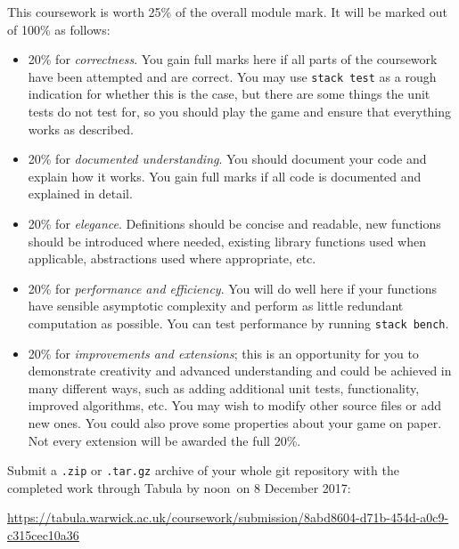 \documentclass{cs256-shared/cs256}
\newcommand{\deadlineTime}{noon}
\newcommand{\deadlineDate}{8 December 2017}
\newcommand{\submissionURL}{https://tabula.warwick.ac.uk/coursework/submission/8abd8604-d71b-454d-a0c9-c315cec10a36}
\begin{document}
This coursework is worth 25\% of the overall module mark. It will be marked out of 100\% as follows:
\begin{itemize}
    \item 20\% for \emph{correctness}. You gain full marks here if all parts of the coursework have been attempted and are correct. You may use \texttt{stack test} as a rough indication for whether this is the case, but there are some things the unit tests do not test for, so you should play the game and ensure that everything works as described.
    \item 20\% for \emph{documented understanding}. You should document your code and explain how it works. You gain full marks if all code is documented and explained in detail.
    \item 20\% for \emph{elegance}. Definitions should be concise and readable, new functions should be introduced where needed, existing library functions used when applicable, abstractions used where appropriate, etc. 
    \item 20\% for \emph{performance and efficiency}. You will do well here if your functions have sensible asymptotic complexity and perform as little redundant computation as possible. You can test performance by running \texttt{stack bench}.
    \item 20\% for \emph{improvements and extensions}; this is an opportunity for you to demonstrate creativity and advanced understanding and could be achieved in many different ways, such as adding additional unit tests, functionality, improved algorithms, etc. You may wish to modify other source files or add new ones. You could also prove some properties about your game on paper. Not every extension will be awarded the full 20\%.
\end{itemize}
Submit a \texttt{.zip} or \texttt{.tar.gz} archive of your whole git repository with the completed work through Tabula by \deadlineTime\ on \deadlineDate:

\begin{center} 
\url{\submissionURL}
\end{center}
\end{document}
